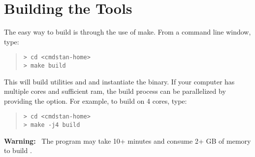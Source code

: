 \section{Building the \CmdStan Tools}\label{build.section}

The easy way to build \CmdStan is through the use of make. From a
command line window, type:
%
\begin{quote}
\begin{Verbatim}[fontshape=sl,fontsize=\small]
> cd <cmdstan-home>
> make build
\end{Verbatim}
\end{quote}
%
This will build utilities  and  and instantiate the  binary.
If your computer has multiple cores and sufficient ram, the build process can be parallelized
by providing the  option. For example, to build on 4 cores, type:
%
\begin{quote}
\begin{Verbatim}[fontshape=sl,fontsize=\small]
> cd <cmdstan-home>
> make -j4 build
\end{Verbatim}
\end{quote}
%
\textbf{Warning:} \ The  program may take 10+ minutes and
consume 2+ GB of memory to build \CmdStan.
